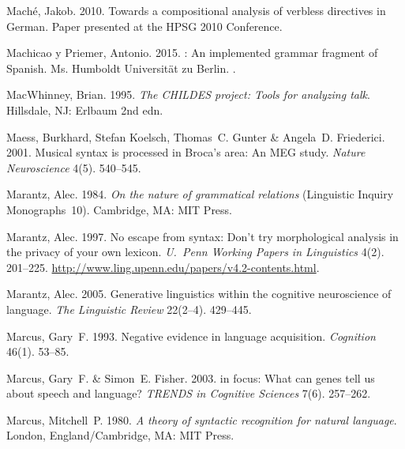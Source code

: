 \begin{thebibliography}{1420}
Mach{\'e}, Jakob. 2010.
\newblock Towards a compositional analysis of verbless directives in {German}.
\newblock Paper presented at the {HPSG 2010 Conference}.

{Machicao y Priemer}, Antonio. 2015.
: {An} implemented grammar fragment of {Spanish}.
\newblock Ms. Humboldt Universit{\"a}t zu Berlin.
\newblock \inPreparation.

MacWhinney, Brian. 1995.
\newblock \emph{The {CHILDES} project: {Tools} for analyzing talk}.
\newblock Hillsdale, NJ: Erlbaum 2nd edn.

Maess, Burkhard, Stefan Koelsch, Thomas~C. Gunter \& Angela~D. Friederici.
  2001.
\newblock Musical syntax is processed in {Broca's} area: {An} {MEG} study.
\newblock \emph{Nature Neuroscience} 4(5). 540--545.

Marantz, Alec. 1984.
\newblock \emph{On the nature of grammatical relations} (Linguistic Inquiry
  Monographs~10).
\newblock Cambridge, MA: MIT Press.

Marantz, Alec. 1997.
\newblock No escape from syntax: {Don't} try morphological analysis in the
  privacy of your own lexicon.
\newblock \emph{U.\ Penn Working Papers in Linguistics} 4(2). 201--225.
\newblock \urlprefix\url{http://www.ling.upenn.edu/papers/v4.2-contents.html}.

Marantz, Alec. 2005.
\newblock Generative linguistics within the cognitive neuroscience of language.
\newblock \emph{The Linguistic Review} 22(2--4). 429--445.

Marcus, Gary~F. 1993.
\newblock Negative evidence in language acquisition.
\newblock \emph{Cognition} 46(1). 53--85.

Marcus, Gary~F. \& Simon~E. Fisher. 2003.
 in focus: {What} can genes tell us about speech and language?
\newblock \emph{TRENDS in Cognitive Sciences} 7(6). 257--262.

Marcus, Mitchell~P. 1980.
\newblock \emph{A theory of syntactic recognition for natural language}.
\newblock London, England/Cambridge, MA: MIT Press.


\end{thebibliography}
